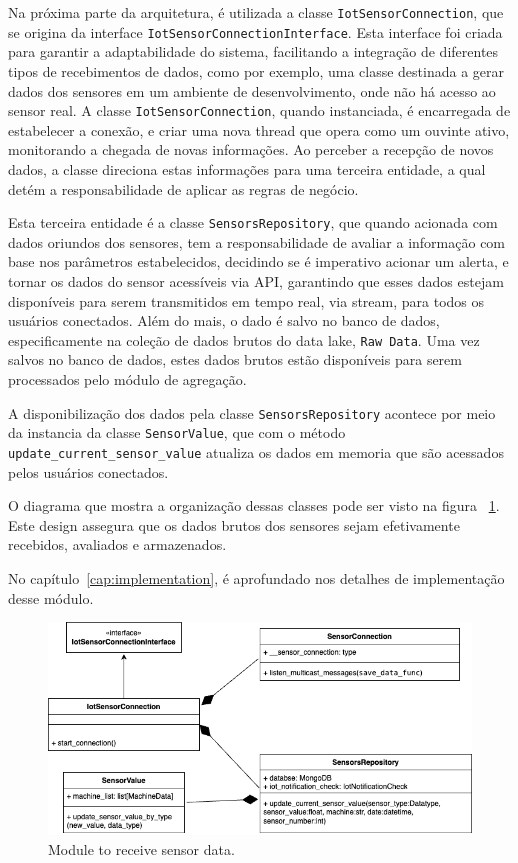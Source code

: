 Na próxima parte da arquitetura, é utilizada a classe \texttt{IotSensorConnection}, que se origina da interface \texttt{IotSensorConnectionInterface}. Esta interface foi criada para garantir a adaptabilidade do sistema, facilitando a integração de diferentes tipos de recebimentos de dados, como por exemplo, uma classe destinada a gerar dados dos sensores em um ambiente de desenvolvimento, onde não há acesso ao sensor real. A classe \texttt{IotSensorConnection}, quando instanciada, é encarregada de estabelecer a conexão, e criar uma nova thread que opera como um ouvinte ativo, monitorando a chegada de novas informações. Ao perceber a recepção de novos dados, a classe direciona estas informações para uma terceira entidade, a qual detém a responsabilidade de aplicar as regras de negócio.

Esta terceira entidade é a classe \texttt{SensorsRepository}, que quando acionada com dados oriundos dos sensores, tem a responsabilidade de avaliar a informação com base nos parâmetros estabelecidos, decidindo se é imperativo acionar um alerta, e tornar os dados do sensor acessíveis via API, garantindo que esses dados estejam disponíveis para serem transmitidos em tempo real, via stream, para todos os usuários conectados. Além do mais, o dado é salvo no banco de dados, especificamente na coleção de dados brutos do data lake, \texttt{Raw Data}. Uma vez salvos no banco de dados, estes dados brutos estão disponíveis para serem processados pelo módulo de agregação.

A disponibilização dos dados pela classe \texttt{SensorsRepository} acontece por meio da instancia da classe \texttt{SensorValue}, que com o método \texttt{update\_current\_sensor\_value} atualiza os dados em memoria que são acessados pelos usuários conectados.

O diagrama que mostra a organização dessas classes pode ser visto na figura ~\ref{fig:receiveData}. Este design assegura que os dados brutos dos sensores sejam efetivamente recebidos, avaliados e armazenados.

No capítulo~\ref{cap:implementation}, é aprofundado nos detalhes de implementação desse módulo.


\begin{figure}[htbp]
	\centering
	\includegraphics[width=\textwidth]{images/recebimento_dados.png}
	\caption{Module to receive sensor data.}
	\label{fig:receiveData}
\end{figure}


